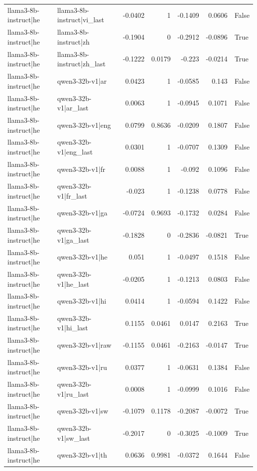 \begin{table}
\begin{tabular}{l l r r r r l}
llama3-8b-instruct|he & llama3-8b-instruct|vi_last & -0.0402 & 1 & -0.1409 & 0.0606 & False \\
llama3-8b-instruct|he & llama3-8b-instruct|zh & -0.1904 & 0 & -0.2912 & -0.0896 & True \\
llama3-8b-instruct|he & llama3-8b-instruct|zh_last & -0.1222 & 0.0179 & -0.223 & -0.0214 & True \\
llama3-8b-instruct|he & qwen3-32b-v1|ar & 0.0423 & 1 & -0.0585 & 0.143 & False \\
llama3-8b-instruct|he & qwen3-32b-v1|ar_last & 0.0063 & 1 & -0.0945 & 0.1071 & False \\
llama3-8b-instruct|he & qwen3-32b-v1|eng & 0.0799 & 0.8636 & -0.0209 & 0.1807 & False \\
llama3-8b-instruct|he & qwen3-32b-v1|eng_last & 0.0301 & 1 & -0.0707 & 0.1309 & False \\
llama3-8b-instruct|he & qwen3-32b-v1|fr & 0.0088 & 1 & -0.092 & 0.1096 & False \\
llama3-8b-instruct|he & qwen3-32b-v1|fr_last & -0.023 & 1 & -0.1238 & 0.0778 & False \\
llama3-8b-instruct|he & qwen3-32b-v1|ga & -0.0724 & 0.9693 & -0.1732 & 0.0284 & False \\
llama3-8b-instruct|he & qwen3-32b-v1|ga_last & -0.1828 & 0 & -0.2836 & -0.0821 & True \\
llama3-8b-instruct|he & qwen3-32b-v1|he & 0.051 & 1 & -0.0497 & 0.1518 & False \\
llama3-8b-instruct|he & qwen3-32b-v1|he_last & -0.0205 & 1 & -0.1213 & 0.0803 & False \\
llama3-8b-instruct|he & qwen3-32b-v1|hi & 0.0414 & 1 & -0.0594 & 0.1422 & False \\
llama3-8b-instruct|he & qwen3-32b-v1|hi_last & 0.1155 & 0.0461 & 0.0147 & 0.2163 & True \\
llama3-8b-instruct|he & qwen3-32b-v1|raw & -0.1155 & 0.0461 & -0.2163 & -0.0147 & True \\
llama3-8b-instruct|he & qwen3-32b-v1|ru & 0.0377 & 1 & -0.0631 & 0.1384 & False \\
llama3-8b-instruct|he & qwen3-32b-v1|ru_last & 0.0008 & 1 & -0.0999 & 0.1016 & False \\
llama3-8b-instruct|he & qwen3-32b-v1|sw & -0.1079 & 0.1178 & -0.2087 & -0.0072 & True \\
llama3-8b-instruct|he & qwen3-32b-v1|sw_last & -0.2017 & 0 & -0.3025 & -0.1009 & True \\
llama3-8b-instruct|he & qwen3-32b-v1|th & 0.0636 & 0.9981 & -0.0372 & 0.1644 & False \\

\end{tabular}
\end{table}

